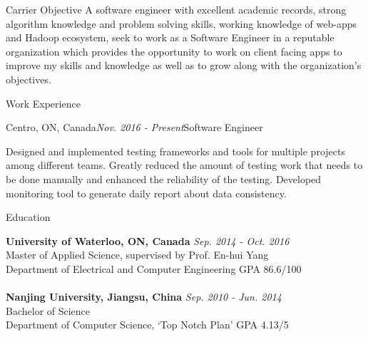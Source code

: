 \documentclass{resume} %
\begin{document}
\begin{rSection}{Carrier Objective}
A software engineer with excellent academic records, 
strong algorithm knowledge and problem solving skills, 
working knowledge of web-apps and Hadoop ecosystem, 
seek to work as a Software Engineer in a reputable organization 
which provides the opportunity to work on client facing apps 
to improve my skills and knowledge as well as to grow along with the organization's objectives.
\end{rSection}


\begin{rSection}{Work Experience}

\begin{rSubsection}{Centro, ON, Canada}{\em{Nov. 2016 - Present}}{Software Engineer}{}
\item Designed and implemented testing frameworks and tools for multiple projects among different teams.
Greatly reduced the amount of testing work that needs to be done manually and enhanced the reliability of the testing.
Developed monitoring tool to generate daily report about data consistency. 
\end{rSubsection}


\end{rSection}


\begin{rSection}{Education}

{\bf University of Waterloo, ON, Canada} \hfill {\em Sep. 2014 - Oct. 2016} 
\\ Master of Applied Science, supervised by Prof. En-hui Yang
\\ Department of Electrical and Computer Engineering \hfill {GPA 86.6/100}\\
\\{\bf Nanjing University, Jiangsu, China} \hfill {\em Sep. 2010 - Jun. 2014} 
\\ Bachelor of Science
\\ Department of Computer Science, `Top Notch Plan' \hfill { GPA 4.13/5 }
\end{rSection}
\end{document}
